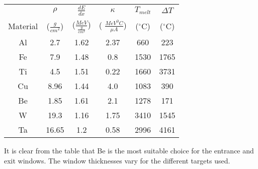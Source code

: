 {\begin{center}\begin{tabular}{|c|c|c|c|c|c|}
\hline 
&
 $\rho $&
 $\frac{dE}{dx}$&
 $\kappa $&
 $T_{melt}$&
 $\Delta T$\\
 Material &
 ($\frac{g}{cm^{2}}$) &
 ($\frac{MeV}{\frac{g}{cm^{2}}}$) &
 ( $\frac{MeV^{0}C}{\mu A}$) &
 ($^{\circ }$C) &
 ($^{\circ }$C) \\
\hline
Al &
2.7 &
1.62 &
2.37 &
660 &
223 \\
\hline
Fe &
7.9 &
1.48 &
0.8 &
1530 &
1765 \\
\hline
Ti &
4.5 &
1.51 &
0.22 &
1660 &
3731 \\
\hline
Cu &
8.96 &
1.44 &
4.0&
1083 &
390 \\
\hline
Be &
1.85 &
1.61 &
2.1 &
1278 &
171 \\
\hline
W &
19.3 &
1.16 &
1.75 &
3410 &
1545 \\
\hline
Ta &
16.65 &
1.2 &
0.58 &
2996 &
4161  \\
\hline
\end{tabular}\end{center}

It is clear from the table that Be is the most suitable choice for
the entrance and exit windows. The window thicknesses vary for the
different targets used.

}
